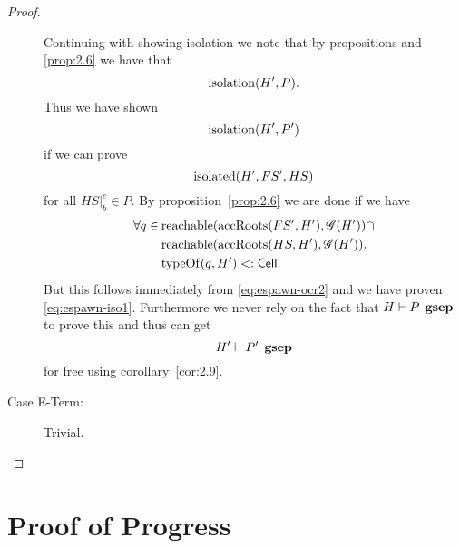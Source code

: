 \begin{proof}
\begin{description}
      Continuing with showing isolation we note that 
      by propositions %
      and \ref{prop:2.6} we have that
      \begin{equation}
        \mbox{$\mathrm{isolation}$}(H', P).
      \end{equation}
      Thus we have shown
      \begin{equation} \label{eq:espawn-iso1}
        \mbox{$\mathrm{isolation}$}(H', P')
      \end{equation}
      if we can prove
      \begin{equation}
        \mbox{$\mathrm{isolated}$}(H', FS', HS)
      \end{equation}
      for all $HS|_b^e \in P$. By proposition~\ref{prop:2.6} we are done if we
      have
      \begin{equation}
        \begin{aligned}
          \forall q \in \: &\mbox{$\mathrm{reachable}$}(\mbox{$\mathrm{accRoots}$}(FS', H'), \mathscr{G}(H')) \cap \\
            &\mbox{$\mathrm{reachable}$}(\mbox{$\mathrm{accRoots}$}(HS, H'), \mathscr{G}(H')) . \\
            &\mbox{$\mathrm{typeOf}$}(q, H') <: \mbox{$\mathsf{Cell}$}.
        \end{aligned}
      \end{equation}
      But this follows immediately from \eqref{eq:espawn-ocr2} and we have
      proven \eqref{eq:espawn-iso1}. Furthermore we
      never rely on the fact that $H \vdash P \:\: \mbox{\bf gsep}$ to prove this and
      thus can get
      \begin{equation}
        H' \vdash P' \:\: \mbox{\bf gsep} 
      \end{equation}
      for free using corollary~\ref{cor:2.9}.

    \item[Case {\sc E-Term}:] Trivial.
  \end{description}
\end{proof}


\section{Proof of Progress}
\label{sec:proof_of_progress}









